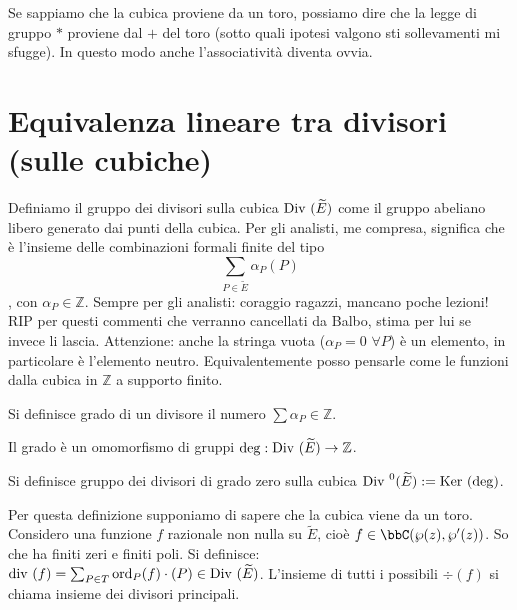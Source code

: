 \begin{osservazione}
Se sappiamo che la cubica proviene da un toro, possiamo dire che la legge di gruppo $*$ proviene dal $+$ del toro (sotto quali ipotesi valgono sti sollevamenti mi sfugge). In questo modo anche l'associatività diventa ovvia.
\end{osservazione}

\section{Equivalenza lineare tra divisori (sulle cubiche)}

\begin{definizione}
Definiamo il gruppo dei divisori sulla cubica $\mbox{Div }(\widetilde{E})$ come il gruppo abeliano libero generato dai punti della cubica. Per gli analisti, me compresa, significa che è l'insieme delle combinazioni formali finite del tipo $$\sum_{P \in \widetilde{E}} \alpha_P(P)$$,
con $\alpha_P \in \mathbb{Z}$.
Sempre per gli analisti: coraggio ragazzi, mancano poche lezioni!
RIP per questi commenti che verranno cancellati da Balbo, stima per lui se invece li lascia.
Attenzione: anche la stringa vuota ($\alpha_P=0$ $\forall P$) è un elemento, in particolare è l'elemento neutro.
Equivalentemente posso pensarle come le funzioni dalla cubica in $\mathbb{Z}$ a supporto finito.
\end{definizione}

\begin{definizione}
Si definisce grado di un divisore il numero $\sum \alpha_P \in \mathbb{Z}$.
\end{definizione} 

\begin{osservazione}Il grado è un omomorfismo di gruppi $\deg: \mbox{Div }(\widetilde{E}) \rightarrow \mathbb{Z}$.
\end{osservazione}


\begin{definizione}
Si definisce gruppo dei divisori di grado zero sulla cubica $\mbox{Div }^0(\widetilde{E}) := \mbox{Ker }(\deg)$.
\end{definizione}

\begin{definizione}
Per questa definizione supponiamo di sapere che la cubica viene da un toro.
Considero una funzione $f$ razionale non nulla su $\widetilde{E}$, cioè $f \in \bbC(\wp(z),\wp'(z))$. So che ha finiti zeri e finiti poli.
Si definisce: $\mbox{div }(f) = \sum_{P\in T} \text{ord}_P(f) \cdot (P) \in \mbox{Div }(\widetilde E)$.
L'insieme di tutti i possibili $\div(f)$ si chiama insieme dei divisori principali.
\end{definizione}


